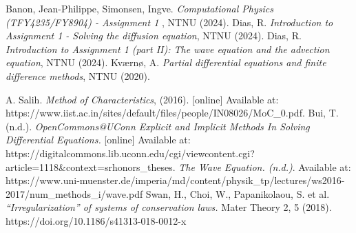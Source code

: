 \documentclass[5p,sort&compress]{elsarticle}
\numberwithin{equation}{subsection}
\begin{document}
\makeatletter
{} %
\makeatother

\begin{thebibliography}{99}

 Banon, Jean-Philippe, Simonsen, Ingve. \textit{Computational Physics (TFY4235/FY8904) - Assignment 1
}, NTNU (2024).
 Dias, R. \textit{Introduction to Assignment 1 - Solving the diffusion equation}, NTNU (2024).
 Dias, R. \textit{Introduction to Assignment 1 (part II): The
wave equation and the advection equation}, NTNU (2024).
 Kværnø, A. \textit{Partial differential equations and finite difference methods}, NTNU (2020).

 A. Salih. \textit{Method of Characteristics}, (2016). [online] Available at: https://www.iist.ac.in/sites/default/files/people/IN08026/MoC\_0.pdf.
 Bui, T. (n.d.). \textit{OpenCommons@UConn Explicit and Implicit Methods In Solving Differential Equations.} [online] Available at: https://digitalcommons.lib.uconn.edu/cgi/viewcontent.cgi?\\article=1118\&context=srhonors\_theses.
 \textit{The Wave Equation. (n.d.)}. Available at: https://www.uni-muenster.de/imperia/md/content/physik\_tp/lectures/ws2016-2017/num\_methods\_i/wave.pdf
\bibitem{}Swan, H., Choi, W., Papanikolaou, S. et al. \textit{“Irregularization” of systems of conservation laws.} Mater Theory 2, 5 (2018). https://doi.org/10.1186/s41313-018-0012-x

\end{thebibliography}

\endgroup
\end{document}
